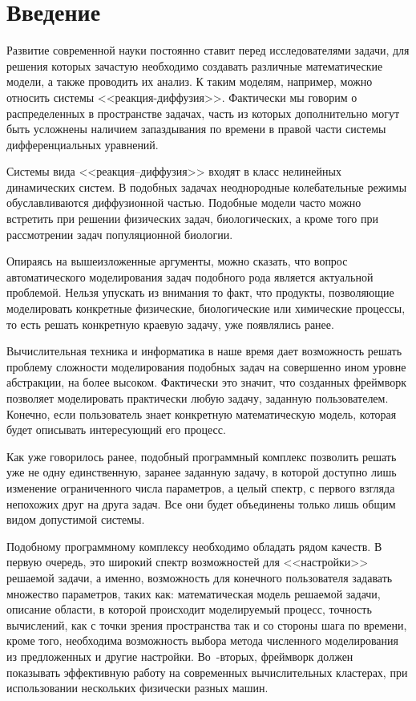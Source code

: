 \documentclass[a4paper, 14pt]{extarticle}
\theoremstyle{definition}
\newcommand{\newsection}[1]{
	\cleardoublepage
	\phantomsection
	\section*{#1}
	\addcontentsline{toc}{section}{#1}
}
\begin{document}
\tableofcontents





\newsection{Введение}

Развитие современной науки постоянно ставит перед исследователями задачи, для решения которых зачастую необходимо создавать различные математические модели, а также проводить их анализ. К таким моделям, например, можно относить системы <<реакция-диффузия>>. Фактически мы говорим о распределенных в пространстве задачах, часть из которых дополнительно могут быть усложнены наличием запаздывания по времени в правой части системы дифференциальных уравнений\cite{GlyzinSD_1}.

Системы вида <<реакция--диффузия>> входят в класс нелинейных динамических систем. В подобных задачах неоднородные колебательные режимы обуславливаются диффузионной частью. Подобные модели часто можно встретить при решении физических задач, биологических, а кроме того при рассмотрении задач популяционной биологии.

Опираясь на вышеизложенные аргументы, можно сказать, что вопрос автоматического моделирования задач подобного рода является актуальной проблемой. Нельзя упускать из внимания то факт, что продукты, позволяющие моделировать конкретные физические, биологические или химические процессы, то есть решать конкретную краевую задачу, уже появлялись ранее.

Вычислительная техника и информатика в наше время дает возможность решать проблему сложности моделирования подобных задач на совершенно ином уровне абстракции, на более высоком. Фактически это значит, что созданных фреймворк позволяет моделировать практически любую задачу, заданную пользователем. Конечно, если пользователь знает конкретную математическую модель, которая будет описывать интересующий его процесс.

Как уже говорилось ранее, подобный программный комплекс позволить решать уже не одну единственную, заранее заданную задачу, в которой доступно лишь изменение ограниченного числа параметров, а целый спектр, с первого взгляда непохожих друг на друга задач. Все они будет объединены только лишь общим видом допустимой системы.

Подобному программному комплексу необходимо обладать рядом качеств. В первую очередь, это широкий спектр возможностей для <<настройки>> решаемой задачи, а именно, возможность для конечного пользователя задавать множество параметров, таких как: математическая модель решаемой задачи, описание области, в которой происходит моделируемый процесс, точность вычислений, как с точки зрения пространства так и со стороны шага по времени, кроме того, необходима возможность выбора метода численного моделирования из предложенных и другие настройки. Во~-вторых, фреймворк должен показывать эффективную работу на современных вычислительных кластерах, при использовании нескольких физически разных машин.
\end{document}

